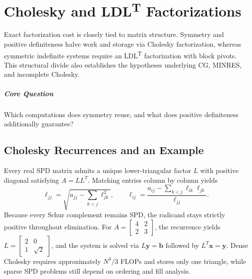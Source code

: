 \chapter{Cholesky and LDL\textsuperscript{T} Factorizations}\label{v0ch:6}
\begin{chaptersummary}
Exact factorization cost is closely tied to matrix structure. Symmetry and positive definiteness halve work and storage via Cholesky factorization, whereas symmetric indefinite systems require an LDL\textsuperscript{T} factorization with block pivots. This structural divide also establishes the hypotheses underlying CG, MINRES, and incomplete Cholesky.
\end{chaptersummary}
\paragraph{Core Question}Which computations does symmetry reuse, and what does positive definiteness additionally guarantee?

\section{Cholesky Recurrences and an Example}
Every real SPD matrix admits a unique lower-triangular factor $L$ with positive diagonal satisfying $A=LL^T$. Matching entries column by column yields
\[
 \ell_{jj}=\sqrt{a_{jj}-\sum_{k<j}\ell_{jk}^2},\qquad
 \ell_{ij}=\frac{a_{ij}-\sum_{k<j}\ell_{ik}\ell_{jk}}{\ell_{jj}}.
\]
Because every Schur complement remains SPD, the radicand stays strictly positive throughout elimination. For
$A=\left[\begin{smallmatrix}4&2\\2&3\end{smallmatrix}\right]$, the recurrence yields
$L=\left[\begin{smallmatrix}2&0\\1&\sqrt2\end{smallmatrix}\right]$, and the system is solved via $L\bm y=\bm b$ followed by $L^T\bm x=\bm y$. Dense Cholesky requires approximately $N^3/3$ FLOPs and stores only one triangle, while sparse SPD problems still depend on ordering and fill analysis.
